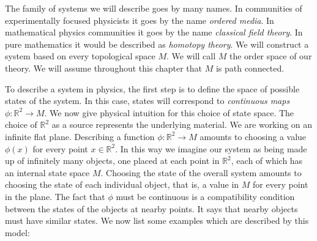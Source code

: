 \documentclass{article}
\theoremstyle{definition}
\newcommand{\RR}{\mathbb{R}}
\newcommand{\0}{\left|0\right>}
\newcommand{\1}{\left|1\right>}
\numberwithin{figure}{section}
\begin{document}
The family of systems we will describe goes by many names. In communities of experimentally focused physicists it goes by the name \textit{ordered media}. In mathematical physics communities it goes by the name \textit{classical field theory}. In pure mathematics it would be described as \textit{homotopy theory}. We will construct a system based on every topological space $M$. We will call $M$ the order space of our theory. We will assume throughout this chapter that $M$ is path connected.

To describe a system in physics, the first step is to define the space of possible states of the system. In this case, states will correspond to \textit{continuous maps $\phi: \RR^2\to M$}. We now give physical intuition for this choice of state space. The choice of $\RR^2$ as a source represents the underlying material. We are working on an infinite flat plane. Describing a function $\phi: \RR^2\to M$ amounts to choosing a value $\phi(x)$ for every point $x\in \RR^2$. In this way we imagine our system as being made up of infinitely many objects, one placed at each point in $\RR^2$, each of which has an internal state space $M$. Choosing the state of the overall system amounts to choosing the state of each individual object, that is, a value in $M$ for every point in the plane. The fact that $\phi$ must be continuous is a compatibility condition between the states of the objects at nearby points. It says that nearby objects must have similar states. We now list some examples which are described by this model:
\end{document}
